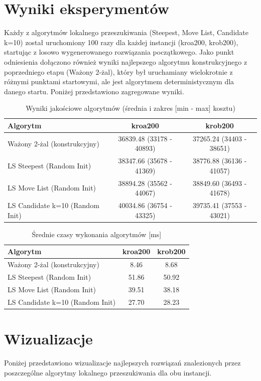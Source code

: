 \documentclass[12pt,a4paper]{article}
\begin{document}
\section{Wyniki eksperymentów}
Każdy z algorytmów lokalnego przeszukiwania (Steepest, Move List, Candidate k=10) został uruchomiony 100 razy dla każdej instancji (kroa200, krob200), startując z losowo wygenerowanego rozwiązania początkowego. Jako punkt odniesienia dołączono również wyniki najlepszego algorytmu konstrukcyjnego z poprzedniego etapu (Ważony 2-żal), który był uruchamiany wielokrotnie z różnymi punktami startowymi, ale jest algorytmem deterministycznym dla danego startu. Poniżej przedstawiono zagregowane wyniki.

\begin{table}[H]
\centering
\caption{Wyniki jakościowe algorytmów (średnia i zakres [min - max] kosztu)}
\label{tab:quality_results}
\begin{tabular}{@{}lcc@{}}
\toprule
\textbf{Algorytm} & \textbf{kroa200} & \textbf{krob200} \\
\midrule
Ważony 2-żal (konstrukcyjny) & 36839.48 (33178 - 40893) & 37265.24 (34403 - 38651) \\
LS Steepest (Random Init) & 38347.66 (35678 - 41369) & 38776.88 (36136 - 41057) \\
LS Move List (Random Init) & 38894.28 (35562 - 44067) & 38849.60 (36493 - 41678) \\
LS Candidate k=10 (Random Init) & 40034.86 (36754 - 43325) & 39735.41 (37553 - 43021) \\
\bottomrule
\end{tabular}
\end{table}

\begin{table}[H]
\centering
\caption{Średnie czasy wykonania algorytmów [ms]}
\label{tab:time_results}
\begin{tabular}{@{}lcc@{}}
\toprule
\textbf{Algorytm} & \textbf{kroa200} & \textbf{krob200} \\
\midrule
Ważony 2-żal (konstrukcyjny) & 8.46 & 8.68 \\
LS Steepest (Random Init) & 51.86 & 50.92 \\
LS Move List (Random Init) & 39.51 & 38.18 \\
LS Candidate k=10 (Random Init) & 27.70 & 28.23 \\
\bottomrule
\end{tabular}
\end{table}

\section{Wizualizacje}
Poniżej przedstawiono wizualizacje najlepszych rozwiązań znalezionych przez poszczególne algorytmy lokalnego przeszukiwania dla obu instancji.
\end{document}
